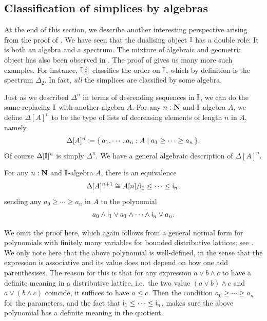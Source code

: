 \subsection{Classification of simplices by algebras}

At the end of this section, we describe another interesting perspective arising from the proof of . We have seen that the dualising object $\mathbb{I}$ has a double role: It is both an algebra and a spectrum. The mixture of algebraic and geometric object has also been observed in . The proof of  gives us many more such examples. For instance, $\mathbb{I}[i]$ classifies the order on $\mathbb{I}$, which by definition is the spectrum $\Delta_2$. In fact, \emph{all} the simplices are classified by some algebra.

Just as we described $\Delta^n$ in terms of descending sequences in $\mathbb{I}$, we can do the same replacing $\mathbb{I}$ with another algebra $A$.
For any $n : \mathbf{N}$ and $\mathbb{I}$-algebra $A$, we define $\Delta[A]^{n}$ to be the type of lists of decreasing elements of length $n$ in $A$, namely
\[ \Delta[A]^{n} \coloneq \scomp{a_1,\cdots,a_n : A}{a_1 \ge \cdots \ge a_n}\text{.} \]
Of course $\Delta[\mathbb{I}]^n$ is simply $\Delta^n$. We have a general algebraic description of $\Delta[A]^n$.

\begin{proposition}\label{prop:simplicesasalgebra}
  For any $n : \mathbf{N}$ and $\mathbb{I}$-algebra $A$, there is an equivalence 
  \[ \Delta[A]^{n+1} \cong A[n]/\ms{i}_1 \le \cdots \le \ms{i}_n\text{,} \]
  sending any $a_0 \ge \cdots \ge a_n$ in $A$ to the polynomial 
  \[ a_0 \wedge \ms{i}_1 \vee a_1 \wedge \cdots \wedge \ms{i}_n \vee a_n\text{.} \]
\end{proposition}

We omit the proof here, which again follows from a general normal form for polynomials with finitely many variables for bounded distributive lattices; see \citet[Ch.\ 1, Thm.\ 10.21]{lausch2000algebra}. We only note here that the above polynomial is well-defined, in the sense that the expression is associative and its value does not depend on how one add parenthesises. The reason for this is that for any expression $a \vee b \wedge c$ to have a definite meaning in a distributive lattice, i.e.\ the two value $(a \vee b) \wedge c$ and $a \vee (b \wedge c)$ coincide, it suffices to have $a \le c$. Then the condition $a_0 \ge \cdots \ge a_n$ for the parameters, and the fact that $\mathsf{i}_1 \le \cdots \le \mathsf{i}_n$, makes sure the above polynomial has a definite meaning in the quotient.


